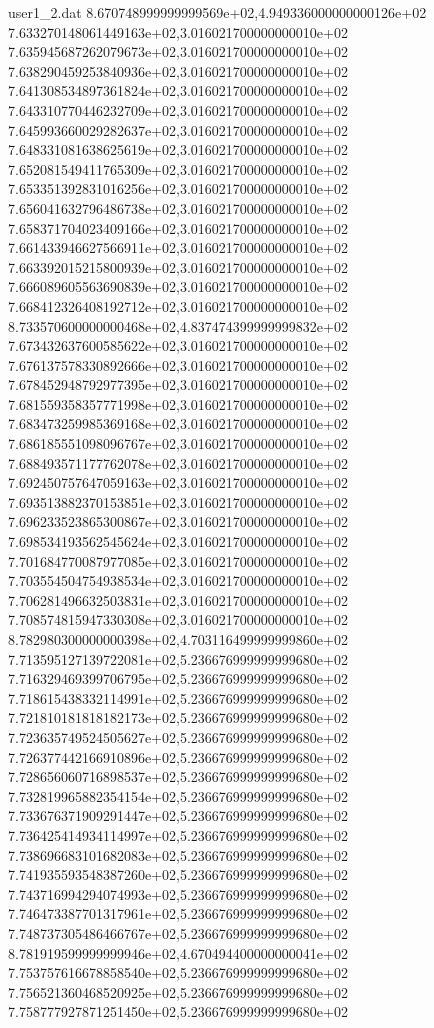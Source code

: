 \begin{filecontents}{user1_2.dat}
8.670748999999999569e+02,4.949336000000000126e+02
7.633270148061449163e+02,3.016021700000000010e+02
7.635945687262079673e+02,3.016021700000000010e+02
7.638290459253840936e+02,3.016021700000000010e+02
7.641308534897361824e+02,3.016021700000000010e+02
7.643310770446232709e+02,3.016021700000000010e+02
7.645993660029282637e+02,3.016021700000000010e+02
7.648331081638625619e+02,3.016021700000000010e+02
7.652081549411765309e+02,3.016021700000000010e+02
7.653351392831016256e+02,3.016021700000000010e+02
7.656041632796486738e+02,3.016021700000000010e+02
7.658371704023409166e+02,3.016021700000000010e+02
7.661433946627566911e+02,3.016021700000000010e+02
7.663392015215800939e+02,3.016021700000000010e+02
7.666089605563690839e+02,3.016021700000000010e+02
7.668412326408192712e+02,3.016021700000000010e+02
8.733570600000000468e+02,4.837474399999999832e+02
7.673432637600585622e+02,3.016021700000000010e+02
7.676137578330892666e+02,3.016021700000000010e+02
7.678452948792977395e+02,3.016021700000000010e+02
7.681559358357771998e+02,3.016021700000000010e+02
7.683473259985369168e+02,3.016021700000000010e+02
7.686185551098096767e+02,3.016021700000000010e+02
7.688493571177762078e+02,3.016021700000000010e+02
7.692450757647059163e+02,3.016021700000000010e+02
7.693513882370153851e+02,3.016021700000000010e+02
7.696233523865300867e+02,3.016021700000000010e+02
7.698534193562545624e+02,3.016021700000000010e+02
7.701684770087977085e+02,3.016021700000000010e+02
7.703554504754938534e+02,3.016021700000000010e+02
7.706281496632503831e+02,3.016021700000000010e+02
7.708574815947330308e+02,3.016021700000000010e+02
8.782980300000000398e+02,4.703116499999999860e+02
7.713595127139722081e+02,5.236676999999999680e+02
7.716329469399706795e+02,5.236676999999999680e+02
7.718615438332114991e+02,5.236676999999999680e+02
7.721810181818182173e+02,5.236676999999999680e+02
7.723635749524505627e+02,5.236676999999999680e+02
7.726377442166910896e+02,5.236676999999999680e+02
7.728656060716898537e+02,5.236676999999999680e+02
7.732819965882354154e+02,5.236676999999999680e+02
7.733676371909291447e+02,5.236676999999999680e+02
7.736425414934114997e+02,5.236676999999999680e+02
7.738696683101682083e+02,5.236676999999999680e+02
7.741935593548387260e+02,5.236676999999999680e+02
7.743716994294074993e+02,5.236676999999999680e+02
7.746473387701317961e+02,5.236676999999999680e+02
7.748737305486466767e+02,5.236676999999999680e+02
8.781919599999999946e+02,4.670494400000000041e+02
7.753757616678858540e+02,5.236676999999999680e+02
7.756521360468520925e+02,5.236676999999999680e+02
7.758777927871251450e+02,5.236676999999999680e+02

\end{filecontents}

